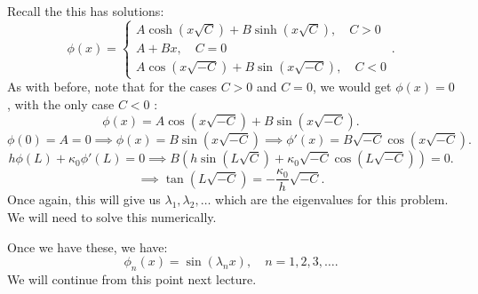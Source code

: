 \documentclass[../main/main.tex]{subfiles}
\begin{document}
\begin{enumerate}
Recall the this has solutions: \[
\phi(x) = \begin{cases}
	A \cosh (x \sqrt{C} ) + B \sinh(x\sqrt{C} ) , \quad C > 0\\
	A+Bx, \quad C = 0 \\
	A \cos (x\sqrt{-C} ) + B \sin(x \sqrt{-C} ) , \quad C< 0
\end{cases}
.\] As with before, note that for the cases $C>0$ and $C=0$, we would get $\phi(x) = 0$, with the only case $C<0$ : \[
\phi(x) = A \cos(x\sqrt{-C} ) + B \sin(x \sqrt{-C} ) 
.\] \[
\phi(0) = A = 0 \implies \phi(x) = B \sin(x \sqrt{-C} ) \implies \phi'(x) = B \sqrt{-C} \cos(x \sqrt{-C} )
.\] \[
h \phi(L) + \kappa_0 \phi'(L) = 0 \implies B\left( h \sin (L\sqrt{C} ) + \kappa_0\sqrt{-C} \cos(L\sqrt{-C} ) \right) =0
.\] \[
\implies \tan \left( L \sqrt{-C}  \right) = - \frac{\kappa_0}{h}\sqrt{-C}  
.\] Once again, this will give us $\lambda_1, \lambda_2, \ldots$ which are the eigenvalues for this problem. We will need to solve this numerically.

Once we have these, we have: \[
	\phi_n(x) = \sin(\lambda_n x ), \quad n = 1,2,3,\ldots
.\] We will continue from this point next lecture.
\end{enumerate}
\end{document}
